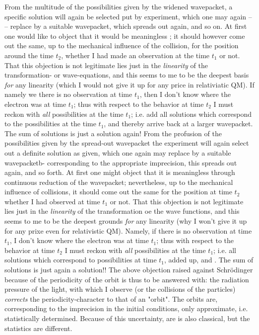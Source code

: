 \documentclass{article}
\begin{document}
From the multitude of the possibilities given by the widened wavepacket, a specific solution will again be selected put by experiment, which one may again --  -- replace by a suitable wavepacket, which spreads out again, and so on. At first one would like to object that it would be meaningless ; it should however come out the same, up to the mechanical influence of the collision, for the position around the time $t_2$, whether I had made an observation at the time $t_1$ or not. That this objection is not legitimate lies just in the \textit{linearity} of the transformation- or wave-equations, and this seems to me to be the deepest basis \textit{for} any linearity (which I would not give it up for any price in relativiatic QM). If namely we there is no observation at time $t_1$, then I don't know where the electron was at time $t_1$; thus with respect to the behavior at time $t_2$ I must reckon with \textit{all} possibilities at the time $t_1$; i.e. add all solutions which correspond to the possibilities at the time $t_1$, and thereby arrive back at a larger wavepacket. The sum of solutions is just a solution again! From the profusion of the possibilities given by the spread-out wavepacket the experiment will again select out a definite solution as given, which one again may replace by a suitable wavepacketb- corresponding to the appropriate imprecision, this spreads out again, and so forth. At first one might object that it is meaningless  through continuous reduction of the wavepacket; nevertheless, up to the mechanical influence of collisions, it should come out the same for the position at time $t_2$ whether I had observed at time $t_1$ or not. That this objection is not legitimate lies just in the \textit{linearity} of the transformation oe the wave functions, and this seems to me to be the deepest grounds \textit{for} any linearity (why I won't give it up for any prixe even for relativistic QM). Namely, if there is no observation at time $t_1$, I don't know where the electron was at time $t_1$; thus with respect to the behavior at time $t_2$ I must reckon with \textit{all} possibilities at the time $t_1$; i.e. all solutions which correspond to possibilities at time $t_1$, added up, and . The sum of solutions is just again a solution!! The above objection raised against Schr\"odinger because of the periodicity of the orbit is thus to be answered with: the radiation pressure of the light, with which I observe (or the collisions of the particles) \textit{corrects} the periodicity-character to that of an "orbit". The orbits are, corresponding to the imprecision in the initial conditions, only approximate, i.e. statistically determined. Because of this uncertainty,  are is also classical, but the statistics are different.
\end{document}
